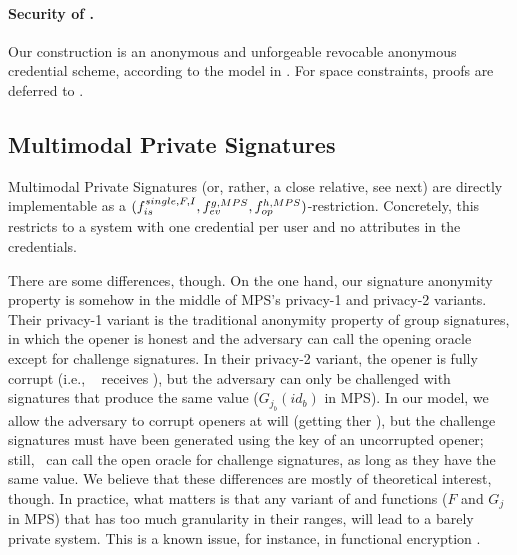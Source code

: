\paragraph{Security of \CUASRAC.} %
Our \CUASRAC construction is an anonymous and unforgeable revocable anonymous
credential scheme, according to the model in . For space
constraints, proofs are deferred to .



\subsection{Multimodal Private Signatures}
\label{ssec:related-models-mps}

Multimodal Private Signatures (or, rather, a close relative, see next) are
directly implementable as a $(f_{is}^{single,F,I},f_{ev}^{g,MPS},
f_{op}^{h,MPS})$-\CUASGen restriction. Concretely, this restricts to a system
with one credential per user and no attributes in the credentials.

There are some differences, though. On the one hand, our signature anonymity
property is somehow in the middle of MPS's privacy-1 and privacy-2 variants.
Their privacy-1 variant is the traditional anonymity property of group
signatures, in which the opener is honest and the adversary can call the opening
oracle except for challenge signatures. In their privacy-2 variant, the opener
is fully corrupt (i.e., \adv~ receives \osk), but the adversary can only be
challenged with signatures that produce the same \yinsp value ($G_{j_b}(id_b)$
in MPS). In our \UAS model, we allow the adversary to corrupt openers at will
(getting ther \osk), but the challenge signatures must have been generated using
the key of an uncorrupted opener; still, \adv~can call the open oracle for
challenge signatures, as long as they have the same \yinsp value. We believe
that these differences are mostly of theoretical interest, though. In practice,
what matters is that any variant of \feval and \finsp functions ($F$ and $G_j$
in MPS) that has too much granularity in their ranges, will lead to a barely
private system. This is a known issue, for instance, in functional encryption
\cite{bsw11}.

